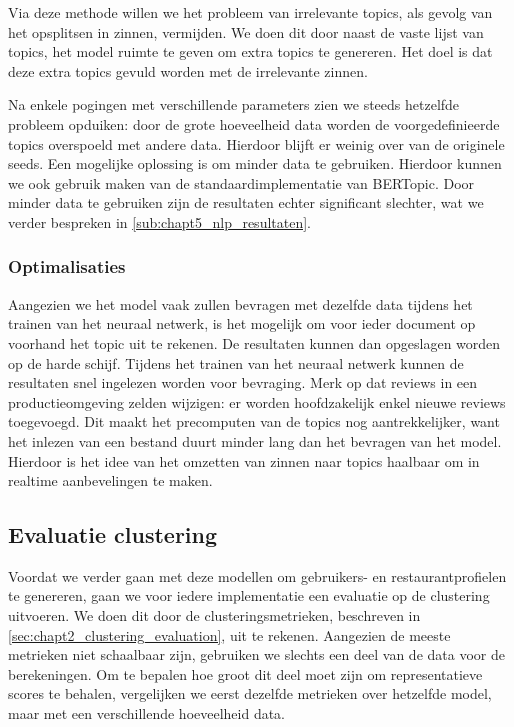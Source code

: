 Via deze methode willen we het probleem van irrelevante topics, als gevolg van het opsplitsen in zinnen, vermijden. We doen dit door naast de vaste lijst van topics, het model ruimte te geven om extra topics te genereren. Het doel is dat deze extra topics gevuld worden met de irrelevante zinnen.

Na enkele pogingen met verschillende parameters zien we steeds hetzelfde probleem opduiken: door de grote hoeveelheid data worden de voorgedefinieerde topics overspoeld met andere data. Hierdoor blijft er weinig over van de originele seeds. Een mogelijke oplossing is om minder data te gebruiken. Hierdoor kunnen we ook gebruik maken van de standaardimplementatie van BERTopic. Door minder data te gebruiken zijn de resultaten echter significant slechter, wat we verder bespreken in \autoref{sub:chapt5_nlp_resultaten}.

\subsubsection{Optimalisaties}
Aangezien we het model vaak zullen bevragen met dezelfde data tijdens het trainen van het neuraal netwerk, is het mogelijk om voor ieder document op voorhand het topic uit te rekenen. De resultaten kunnen dan opgeslagen worden op de harde schijf. Tijdens het trainen van het neuraal netwerk kunnen de resultaten snel ingelezen worden voor bevraging. Merk op dat reviews in een productieomgeving zelden wijzigen: er worden hoofdzakelijk enkel nieuwe reviews toegevoegd. Dit maakt het precomputen van de topics nog aantrekkelijker, want het inlezen van een bestand duurt minder lang dan het bevragen van het model. Hierdoor is het idee van het omzetten van zinnen naar topics haalbaar om in realtime aanbevelingen te maken.

\subsection{Evaluatie clustering}
\label{sub:chapt4_eval_clustering}
Voordat we verder gaan met deze modellen om gebruikers- en restaurantprofielen te genereren, gaan we voor iedere implementatie een evaluatie op de clustering uitvoeren. We doen dit door de clusteringsmetrieken, beschreven in \autoref{sec:chapt2_clustering_evaluation}, uit te rekenen. Aangezien de meeste metrieken niet schaalbaar zijn, gebruiken we slechts een deel van de data voor de berekeningen. Om te bepalen hoe groot dit deel moet zijn om representatieve scores te behalen, vergelijken we eerst dezelfde metrieken over hetzelfde model, maar met een verschillende hoeveelheid data.

